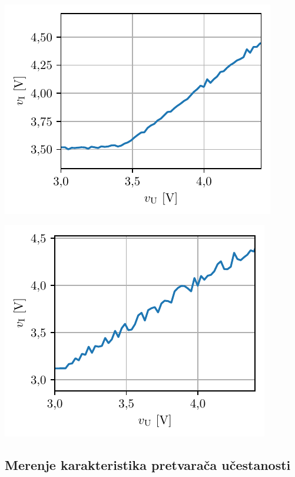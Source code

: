 \documentclass[a4paper, 12pt, diplomski]{etf}
\begin{document}
\begin{center}
\begin{minipage}{0.45\textwidth}
\centering
\includegraphics[scale=1]{fig_osc/DCsweep.pdf}
\label{DCsweep}
\end{minipage}\hfill
\begin{minipage}{0.45\textwidth}
\includegraphics[scale=1]{fig_osc/DCsweepNF.pdf} 
\label{DCsweepNF} 
\end{minipage}
\end{center}



\subsection{Merenje karakteristika pretvarača učestanosti}
\end{document}
